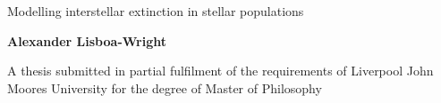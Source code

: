 \documentclass[12pt, a4paper]{report}
\begin{document}
\begin{titlepage}

\vspace*{-0.4cm}

\begin{center}

\vspace*{0.5cm}
{\Huge \sc Modelling interstellar extinction in stellar populations \par}
\vspace*{3cm}


{\bf Alexander Lisboa-Wright}

\vspace*{4cm}
{\normalsize A thesis submitted in partial fulfilment of the requirements of Liverpool John Moores University for the degree of Master of Philosophy}


\end{center}

\vspace*{3.0cm}

\end{titlepage}
\end{document}
